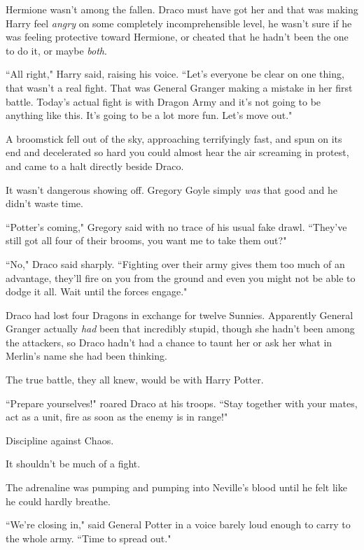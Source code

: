 Hermione wasn't among the fallen. Draco must have got her and that was making Harry feel \emph{angry} on some completely incomprehensible level, he wasn't sure if he was feeling protective toward Hermione, or cheated that he hadn't been the one to do it, or maybe \emph{both}.

``All right," Harry said, raising his voice. ``Let's everyone be clear on one thing, that wasn't a real fight. That was General Granger making a mistake in her first battle. Today's actual fight is with Dragon Army and it's not going to be anything like this. It's going to be a lot more fun. Let's move out."

\later

A broomstick fell out of the sky, approaching terrifyingly fast, and spun on its end and decelerated so hard you could almost hear the air screaming in protest, and came to a halt directly beside Draco.

It wasn't dangerous showing off. Gregory Goyle simply \emph{was} that good and he didn't waste time.

``Potter's coming," Gregory said with no trace of his usual fake drawl. ``They've still got all four of their brooms, you want me to take them out?"

``No," Draco said sharply. ``Fighting over their army gives them too much of an advantage, they'll fire on you from the ground and even you might not be able to dodge it all. Wait until the forces engage."

Draco had lost four Dragons in exchange for twelve Sunnies. Apparently General Granger actually \emph{had} been that incredibly stupid, though she hadn't been among the attackers, so Draco hadn't had a chance to taunt her or ask her what in Merlin's name she had been thinking.

The true battle, they all knew, would be with Harry Potter.

``Prepare yourselves!" roared Draco at his troops. ``Stay together with your mates, act as a unit, fire as soon as the enemy is in range!"

Discipline against Chaos.

It shouldn't be much of a fight.

\later

The adrenaline was pumping and pumping into Neville's blood until he felt like he could hardly breathe.

``We're closing in," said General Potter in a voice barely loud enough to carry to the whole army. ``Time to spread out."

